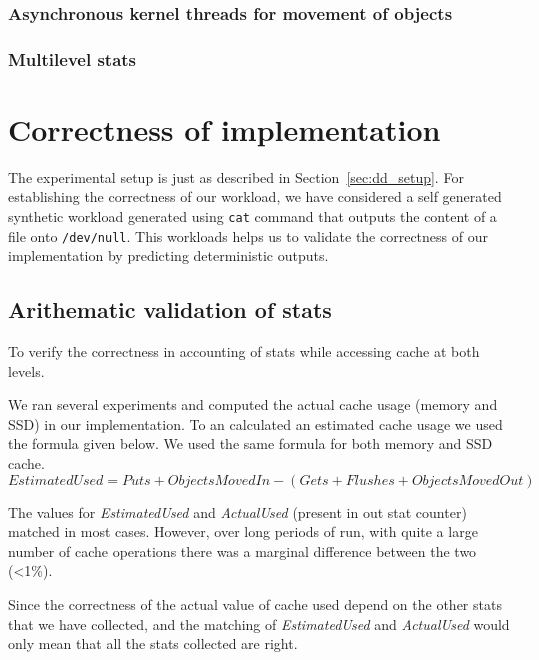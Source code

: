       \subsubsection{Asynchronous kernel threads for movement of objects}
      
      \subsubsection{Multilevel stats}
  
  \newpage
  
  \section{Correctness of implementation}
  
      The experimental setup is just as described in Section~\ref{sec:dd_setup}.
      For establishing the correctness of our workload, we have considered a self 
      generated synthetic workload generated using \texttt{cat} command that 
      outputs the content of a file onto \texttt{/dev/null}. This workloads helps 
      us to validate the correctness of our implementation by predicting deterministic
      outputs.
  
    \subsection{Arithematic validation of stats}
    
	    To verify the correctness in accounting of stats while accessing cache at both levels.
	    
	We ran several experiments and computed the actual cache usage (memory and SSD) in our implementation. To an calculated 
	an estimated cache usage we used the formula given below. We used the same formula for both memory and SSD cache. 
	  \begin{equation}
	    EstimatedUsed = Puts + ObjectsMovedIn - (Gets + Flushes + ObjectsMovedOut)
	  \end{equation}
      
	The values for \textit{EstimatedUsed} and \textit{ActualUsed} (present in out stat counter) matched in most cases.
	However, over long periods of run, with quite a large number of cache operations there was a marginal difference
	between the two (\textless 1\%).
	
	Since the correctness of the actual value of cache used depend on the other stats that we have collected, and the 
	matching of \textit{EstimatedUsed} and \textit{ActualUsed} would only mean that all the stats collected are right.
    
